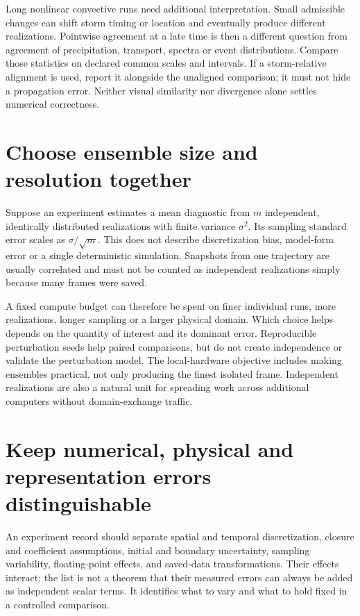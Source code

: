 Long nonlinear convective runs need additional interpretation. Small admissible
changes can shift storm timing or location and eventually produce different
realizations. Pointwise agreement at a late time is then a different question
from agreement of precipitation, transport, spectra or event distributions.
Compare those statistics on declared common scales and intervals. If a
storm-relative alignment is used, report it alongside the unaligned comparison;
it must not hide a propagation error. Neither visual similarity nor divergence
alone settles numerical correctness.

\section{Choose ensemble size and resolution together}

Suppose an experiment estimates a mean diagnostic from $m$ independent,
identically distributed realizations with finite variance $\sigma^2$. Its
sampling standard error scales as $\sigma/\sqrt m$. This does not describe
discretization bias, model-form error or a single deterministic simulation.
Snapshots from one trajectory are usually correlated and must not be counted
as independent realizations simply because many frames were saved.

A fixed compute budget can therefore be spent on finer individual runs, more
realizations, longer sampling or a larger physical domain. Which choice helps
depends on the quantity of interest and its dominant error. Reproducible
perturbation seeds help paired comparisons, but do not create independence
or validate the perturbation model. The local-hardware objective includes
making ensembles practical, not only producing the finest isolated frame.
Independent realizations are also a natural unit for spreading work across
additional computers without domain-exchange traffic.

\section{Keep numerical, physical and representation errors distinguishable}

An experiment record should separate spatial and temporal discretization,
closure and coefficient assumptions, initial and boundary uncertainty,
sampling variability, floating-point effects, and saved-data transformations.
Their effects interact; the list is not a theorem that their measured errors
can always be added as independent scalar terms. It identifies what to vary
and what to hold fixed in a controlled comparison.

